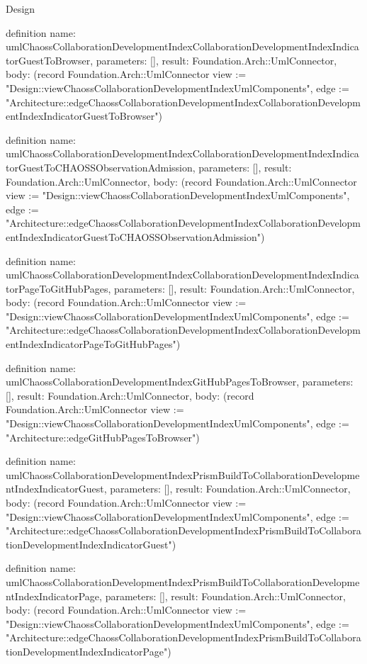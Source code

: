 \begin{lexlean}{Design}
\begin{semanticmodule}
definition{
  name: umlChaossCollaborationDevelopmentIndexCollaborationDevelopmentIndexIndicatorGuestToBrowser,
  parameters: [],
  result: Foundation.Arch::UmlConnector,
  body: (record Foundation.Arch::UmlConnector {view := "Design::viewChaossCollaborationDevelopmentIndexUmlComponents", edge := "Architecture::edgeChaossCollaborationDevelopmentIndexCollaborationDevelopmentIndexIndicatorGuestToBrowser"})
}

definition{
  name: umlChaossCollaborationDevelopmentIndexCollaborationDevelopmentIndexIndicatorGuestToCHAOSSObservationAdmission,
  parameters: [],
  result: Foundation.Arch::UmlConnector,
  body: (record Foundation.Arch::UmlConnector {view := "Design::viewChaossCollaborationDevelopmentIndexUmlComponents", edge := "Architecture::edgeChaossCollaborationDevelopmentIndexCollaborationDevelopmentIndexIndicatorGuestToCHAOSSObservationAdmission"})
}

definition{
  name: umlChaossCollaborationDevelopmentIndexCollaborationDevelopmentIndexIndicatorPageToGitHubPages,
  parameters: [],
  result: Foundation.Arch::UmlConnector,
  body: (record Foundation.Arch::UmlConnector {view := "Design::viewChaossCollaborationDevelopmentIndexUmlComponents", edge := "Architecture::edgeChaossCollaborationDevelopmentIndexCollaborationDevelopmentIndexIndicatorPageToGitHubPages"})
}

definition{
  name: umlChaossCollaborationDevelopmentIndexGitHubPagesToBrowser,
  parameters: [],
  result: Foundation.Arch::UmlConnector,
  body: (record Foundation.Arch::UmlConnector {view := "Design::viewChaossCollaborationDevelopmentIndexUmlComponents", edge := "Architecture::edgeGitHubPagesToBrowser"})
}

definition{
  name: umlChaossCollaborationDevelopmentIndexPrismBuildToCollaborationDevelopmentIndexIndicatorGuest,
  parameters: [],
  result: Foundation.Arch::UmlConnector,
  body: (record Foundation.Arch::UmlConnector {view := "Design::viewChaossCollaborationDevelopmentIndexUmlComponents", edge := "Architecture::edgeChaossCollaborationDevelopmentIndexPrismBuildToCollaborationDevelopmentIndexIndicatorGuest"})
}

definition{
  name: umlChaossCollaborationDevelopmentIndexPrismBuildToCollaborationDevelopmentIndexIndicatorPage,
  parameters: [],
  result: Foundation.Arch::UmlConnector,
  body: (record Foundation.Arch::UmlConnector {view := "Design::viewChaossCollaborationDevelopmentIndexUmlComponents", edge := "Architecture::edgeChaossCollaborationDevelopmentIndexPrismBuildToCollaborationDevelopmentIndexIndicatorPage"})
}


\end{semanticmodule}
\end{lexlean}
